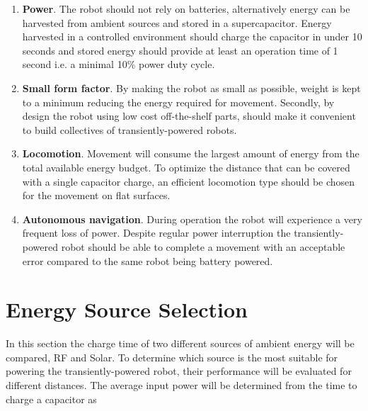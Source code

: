 \begin{enumerate}
	\item \textbf{Power}. 
	The robot should not rely on batteries, alternatively energy can be harvested from ambient sources and stored in a supercapacitor. 
	Energy harvested in a controlled environment should charge the capacitor in under 10 seconds and stored energy should provide at least an operation time of 1 second i.e. a minimal 10\% power duty cycle.
	
	\item \textbf{Small form factor}. 
	By making the robot as small as possible, weight is kept to a minimum reducing the energy required for movement.
	Secondly, by design the robot using low cost off-the-shelf parts, should make it convenient to build collectives of transiently-powered robots.
	
	\item \textbf{Locomotion}.
	Movement will consume the largest amount of energy from the total available energy budget.
	To optimize the distance that can be covered with a single capacitor charge, an efficient locomotion type should be chosen for the movement on flat surfaces.
	
	\item \textbf{Autonomous navigation}.
	During operation the robot will experience a very frequent loss of power. 
	Despite regular power interruption the transiently-powered robot should be able to complete a movement with an acceptable error compared to the same robot being battery powered.
	
\end{enumerate}

\section{Energy Source Selection}
\label{sec:pre_energy_source_selection}

In this section the charge time of two different sources of ambient energy will be compared, RF and Solar.
To determine which source is the most suitable for powering the transiently-powered robot, their performance will be evaluated for different distances.
The average input power will be determined from the time to charge a capacitor as

